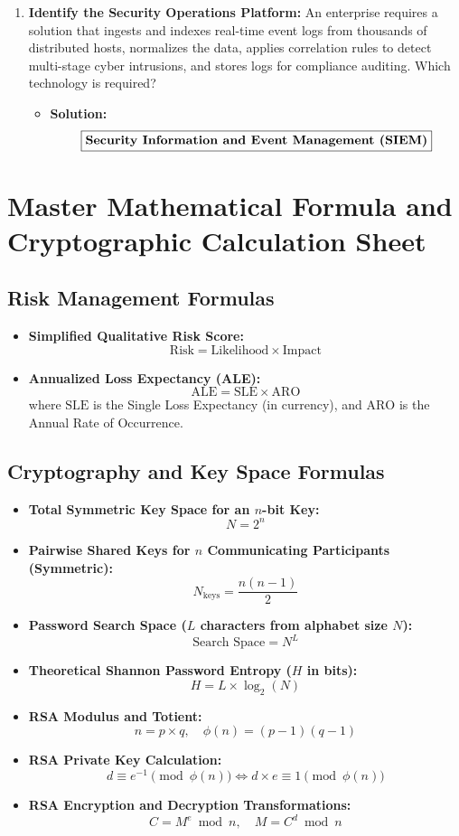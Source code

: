 \begin{enumerate}[label=\textbf{Problem \arabic*.,resume},leftmargin=1.5cm]
\item \textbf{Identify the Security Operations Platform:}
An enterprise requires a solution that ingests and indexes real-time event logs from thousands of distributed hosts, normalizes the data, applies correlation rules to detect multi-stage cyber intrusions, and stores logs for compliance auditing. Which technology is required?
\begin{itemize}
\item \textbf{Solution:}
\[ \boxed{\text{\textbf{Security Information and Event Management (SIEM)}}} \]
\end{itemize}
\end{enumerate}

\newpage
\section{Master Mathematical Formula and Cryptographic Calculation Sheet}

\subsection{Risk Management Formulas}

\begin{itemize}
\item \textbf{Simplified Qualitative Risk Score:}
\[ \text{Risk} = \text{Likelihood} \times \text{Impact} \]
\item \textbf{Annualized Loss Expectancy (ALE):}
\[ \text{ALE} = \text{SLE} \times \text{ARO} \]
where $\text{SLE}$ is the Single Loss Expectancy (in currency), and $\text{ARO}$ is the Annual Rate of Occurrence.
\end{itemize}

\subsection{Cryptography and Key Space Formulas}

\begin{itemize}
\item \textbf{Total Symmetric Key Space for an $n$-bit Key:}
\[ N = 2^n \]
\item \textbf{Pairwise Shared Keys for $n$ Communicating Participants (Symmetric):}
\[ N_{\text{keys}} = \frac{n(n - 1)}{2} \]
\item \textbf{Password Search Space ($L$ characters from alphabet size $N$):}
\[ \text{Search Space} = N^L \]
\item \textbf{Theoretical Shannon Password Entropy ($H$ in bits):}
\[ H = L \times \log_2(N) \]
\item \textbf{RSA Modulus and Totient:}
\[ n = p \times q, \quad \phi(n) = (p - 1)(q - 1) \]
\item \textbf{RSA Private Key Calculation:}
\[ d \equiv e^{-1} \pmod{\phi(n)} \iff d \times e \equiv 1 \pmod{\phi(n)} \]
\item \textbf{RSA Encryption and Decryption Transformations:}
\[ C = M^e \bmod n, \quad M = C^d \bmod n \]
\end{itemize}

